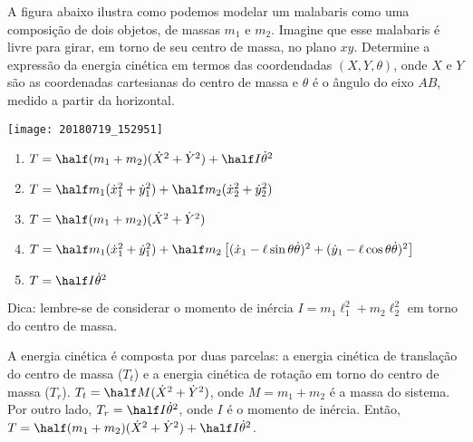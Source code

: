\begin{question}
  	A figura abaixo ilustra como podemos modelar um malabaris como uma composição de dois objetos, de massas $m_1$ e $m_2$.
  	Imagine que esse malabaris é livre para girar, em torno de seu centro de massa, no plano $xy$.
  	Determine a expressão da energia cinética em termos das coordendadas $(X,Y,\theta)$, onde $X$ e $Y$ são as coordenadas cartesianas do centro de massa e $\theta$ é o ângulo do eixo $AB$, medido a partir da horizontal.

		\begin{center}
    	\texttt{[image: 20180719\_152951]}
    \end{center}

  	\begin{enumerate}
  		\item $T = \half (m_1 + m_2) (\dot X^2 + \dot Y^2) + \half I \dot\theta^2$ \rightanswer
  		\item $T = \half m_1 (\dot x_1^2 + \dot y_1^2) + \half m_2 (\dot x_2^2 + \dot y_2^2)$
  		\item $T = \half (m_1 + m_2) (\dot X^2 + \dot Y^2)$
  		\item $T = \half m_1 (\dot x_1^2 + \dot y_1^2) + \half m_2 \left[(\dot x_1 - \ell \sin\theta \dot\theta)^2 + (\dot y_1 - \ell \cos\theta \dot\theta)^2\right]$
  		\item $T = \half I \dot\theta^2$
  	\end{enumerate}

  	\bigskip
  	\begin{compactdesc}
  		\item[Dica:] lembre-se de considerar o momento de inércia $I = m_1\ell_1^2 + m_2\ell_2^2$ em torno do centro de massa.
  	\end{compactdesc}

    \begin{solution}
      A energia cinética é composta por duas parcelas: a energia cinética de translação do centro de massa ($T_t$) e a energia cinética de rotação em torno do centro de massa ($T_r$).
      $T_t = \half M (\dot X^2 + \dot Y^2)$, onde $M = m_1 + m_2$ é a massa do sistema.
      Por outro lado, $T_r = \half I \dot\theta^2$, onde $I$ é o momento de inércia.
      Então, $T = \half (m_1 + m_2) (\dot X^2 + \dot Y^2) + \half I \dot\theta^2$.
    \end{solution}
\end{question}